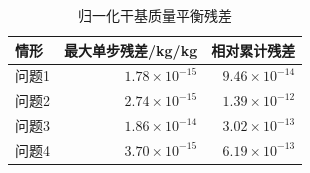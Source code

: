 \begin{table}[!htbp]\centering
\caption{归一化干基质量平衡残差}
\begin{tabular}{lrr}\toprule
情形 & 最大单步残差/kg/kg & 相对累计残差\\\midrule
问题1 & $1.78\times10^{-15}$ & $9.46\times10^{-14}$\\
问题2 & $2.74\times10^{-15}$ & $1.39\times10^{-12}$\\
问题3 & $1.86\times10^{-14}$ & $3.02\times10^{-13}$\\
问题4 & $3.70\times10^{-15}$ & $6.19\times10^{-13}$\\
\bottomrule\end{tabular}\end{table}
